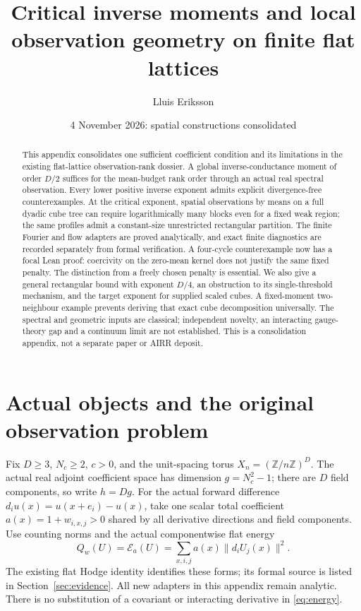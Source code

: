 \documentclass[11pt]{article}
\title{Critical inverse moments and local observation geometry on finite flat lattices}
\author{Lluis Eriksson}
\date{4 November 2026: spatial constructions consolidated}
\newcommand{\E}{\mathcal E}
\begin{document}
\maketitle
\begin{abstract}
This appendix consolidates one sufficient coefficient condition and its limitations in the
existing flat-lattice observation-rank dossier. A global inverse-conductance moment of
order $D/2$ suffices for the mean-budget rank order through an actual real spectral
observation. Every lower positive inverse exponent admits explicit divergence-free
counterexamples. At the critical exponent, spatial observations by means on a full dyadic
cube tree can require logarithmically many blocks even for a fixed weak region; the same
profiles admit a constant-size unrestricted rectangular partition. The finite Fourier
and flow adapters are proved analytically, and exact finite diagnostics are recorded
separately from formal verification. A four-cycle counterexample now has a focal Lean
proof: coercivity on the zero-mean kernel does not justify the same fixed penalty.
The distinction from a freely chosen penalty is essential. We also give a general
rectangular bound with exponent $D/4$, an obstruction to its single-threshold
mechanism, and the target exponent for supplied scaled cubes. A fixed-moment
two-neighbour example prevents deriving that exact cube decomposition universally.
The spectral and geometric inputs are classical; independent
novelty, an interacting gauge-theory gap and a continuum limit are not established.
This is a consolidation appendix, not a separate paper or AIRR deposit.
\end{abstract}

\section{Actual objects and the original observation problem}
Fix $D\geq3$, $N_c\geq2$, $c>0$, and the unit-spacing torus
$X_n=(\mathbb Z/n\mathbb Z)^D$. The actual real adjoint coefficient space has dimension
$g=N_c^2-1$; there are $D$ field components, so write $h=Dg$.
For the actual forward difference $d_i u(x)=u(x+e_i)-u(x)$, take one scalar total
coefficient $a(x)=1+w_{i,x,j}>0$ shared by all derivative directions and field components.
Use counting norms and the actual componentwise flat energy
\begin{equation}\label{eq:energy}
 Q_w(U)=\E_a(U)=\sum_{x,i,j}a(x)\|d_iU_j(x)\|^2.
\end{equation}
The existing flat Hodge identity identifies these forms; its formal source is listed
in Section~\ref{sec:evidence}. All new adapters in this appendix remain analytic.
There is no substitution of a covariant or interacting derivative in \eqref{eq:energy}.
\end{document}
